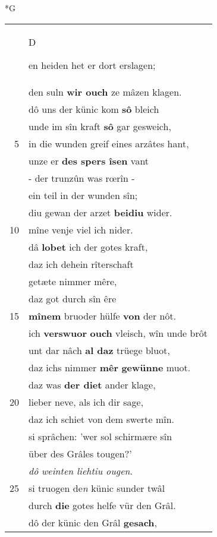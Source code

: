 \documentclass[8pt,a4paper,notitlepage]{article}
\begin{document}
\begin{table}[ht]
\begin{minipage}[t]{0.5\linewidth}
\small
\begin{center}*G
\end{center}
\begin{tabular}{rl}
 & \begin{large}D\end{large}en heiden het er dort erslagen;\\ 
 & den suln \textbf{wir ouch} ze mâzen klagen.\\ 
 & dô uns der künic kom \textbf{sô} bleich\\ 
 & unde im sîn kraft \textbf{sô} gar gesweich,\\ 
5 & in die wunden greif eines arzâtes hant,\\ 
 & unze er \textbf{des spers îsen} vant\\ 
 & - der trunzûn was rœrîn -\\ 
 & ein teil in der wunden sîn;\\ 
 & diu gewan der arzet \textbf{beidiu} wider.\\ 
10 & mîne venje viel ich nider.\\ 
 & dâ \textbf{lobet} ich der gotes kraft,\\ 
 & daz ich dehein rîterschaft\\ 
 & getæte nimmer mêre,\\ 
 & daz got durch sîn êre\\ 
15 & \textbf{mînem} bruoder hülfe \textbf{von} der nôt.\\ 
 & ich \textbf{verswuor} \textbf{ouch} vleisch, wîn unde brôt\\ 
 & unt dar nâch \textbf{al daz} trüege bluot,\\ 
 & daz ichs nimmer \textbf{mêr} \textbf{gewünne} muot.\\ 
 & daz was \textbf{der diet} ander klage,\\ 
20 & lieber neve, als ich dir sage,\\ 
 & daz ich schiet von dem swerte mîn.\\ 
 & si sprâchen: 'wer sol schirmære sîn\\ 
 & über des Grâles tougen?'\\ 
 & \textit{dô} \textit{weinten liehtiu ougen}.\\ 
25 & si truogen de\textit{n} künic sunder twâl\\ 
 & durch \textbf{die} gotes helfe vür den Grâl.\\ 
 & dô der künic den Grâl \textbf{gesach},\\ 

\end{tabular}
\end{minipage}
\end{table}
\end{document}

